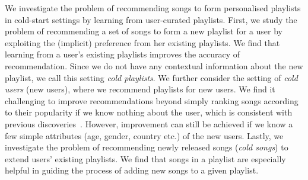 %
We investigate the problem of recommending songs to form personalised playlists %
in cold-start settings by learning from user-curated playlists.
%
%
First, we study the problem of recommending a set of songs to form a new playlist for a user
by exploiting the (implicit) preference %
from her existing playlists.
We find that learning from a user's existing playlists %
improves the accuracy of recommendation.
Since we do not have any contextual information about the new playlist, 
we call this setting \emph{cold playlists}.
%
We further consider the setting of \emph{cold users} (\ie new users),
where we recommend playlists for new users.
We find it challenging to improve recommendations beyond simply ranking songs according to their popularity 
if we know nothing about the user, which is consistent with previous 
discoveries~\cite{mcfee2012million,bonnin2013evaluating,bonnin2015automated}.
However, improvement can still be achieved if we know a few simple attributes (\eg age, gender, country etc.)
of the new users.
%
%
%
Lastly, we investigate the problem of recommending newly released songs (\ie \emph{cold songs}) to extend users' existing playlists. 
We find that songs in a playlist are especially helpful in guiding the process of adding new songs to a given playlist.



